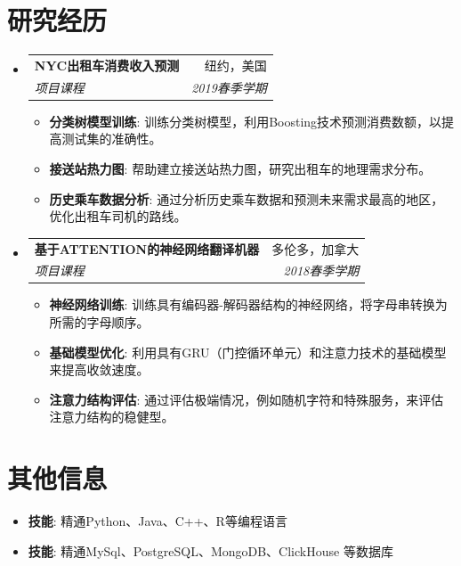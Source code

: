 \documentclass[a4paper,10pt]{article}
\makeatletter
\newcommand{\resumeItem}[2]{
  \item\small{
    \textbf{#1}{: #2 \vspace{-2pt}}
  }
}
\newcommand{\resumeSubheading}[4]{
  \vspace{-1pt}\item
    \begin{tabular*}{0.97\textwidth}[t]{l@{\extracolsep{\fill}}r}
      \textbf{#1} & #2 \\
      \textit{\small#3} & \textit{\small #4} \\
    \end{tabular*}\vspace{-5pt}
}
\newcommand{\resumeSubItem}[2]{\resumeItem{#1}{#2}\vspace{-4pt}}
\newcommand{\resumeSubHeadingListStart}{\begin{itemize}[leftmargin=*]}
\newcommand{\resumeSubHeadingListEnd}{\end{itemize}}
\newcommand{\resumeItemListStart}{\begin{itemize}}
\newcommand{\resumeItemListEnd}{\end{itemize}\vspace{-5pt}}
\makeatother
\begin{document}
\section{研究经历}
\resumeSubHeadingListStart
\resumeSubheading
{NYC出租车消费收入预测}{纽约，美国}
{项目课程}{2019春季学期}
\resumeItemListStart
\resumeItem{分类树模型训练}
{训练分类树模型，利用Boosting技术预测消费数额，以提高测试集的准确性。}
\resumeItem{接送站热力图}
{帮助建立接送站热力图，研究出租车的地理需求分布。}
\resumeItem{历史乘车数据分析}
{通过分析历史乘车数据和预测未来需求最高的地区，优化出租车司机的路线。}
\resumeItemListEnd

\resumeSubheading
{基于ATTENTION的神经网络翻译机器}{多伦多，加拿大}
{项目课程}{2018春季学期}
\resumeItemListStart
\resumeItem{神经网络训练}
{训练具有编码器-解码器结构的神经网络，将字母串转换为所需的字母顺序。}
\resumeItem{基础模型优化}
{利用具有GRU（门控循环单元）和注意力技术的基础模型来提高收敛速度。}
\resumeItem{注意力结构评估}
{通过评估极端情况，例如随机字符和特殊服务，来评估注意力结构的稳健型。}
\resumeItemListEnd

\resumeSubHeadingListEnd

\section{其他信息}
\resumeSubHeadingListStart
\resumeSubItem{技能}
{精通Python、Java、C++、R等编程语言}
\resumeSubItem{技能}
{精通MySql、PostgreSQL、MongoDB、ClickHouse 等数据库}
\resumeSubHeadingListEnd
\end{document}
